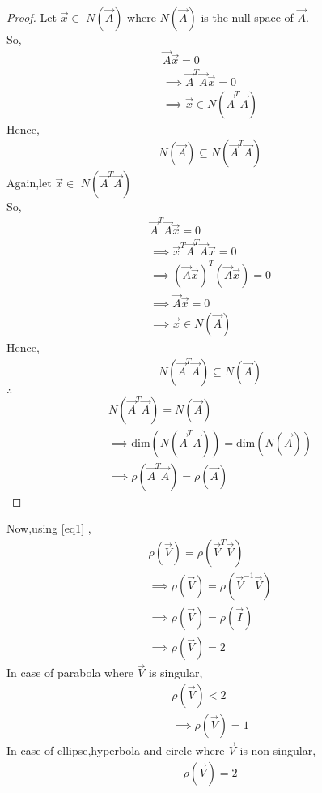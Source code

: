 \documentclass[journal,12pt,twocolumn]{IEEEtran}
\begin{document}
\begin{proof}
Let $\vec{x} \in$ $N(\vec{A})$ where $N(\vec{A})$ is the null space of $\vec{A}$.
\\
So,
\begin{align}
    \vec{A}\vec{x} = 0
    \\
    \implies \vec{A}^T\vec{A}\vec{x} = 0
    \\
    \implies \vec{x} \in N(\vec{A}^T\vec{A})
\end{align}
Hence,
\begin{align}
    N(\vec{A}) \subseteq N(\vec{A}^T\vec{A})
\end{align}
Again,let $\vec{x} \in$ $N(\vec{A}^T\vec{A})$
\\
So,
\begin{align}
    \vec{A}^T\vec{A}\vec{x} = 0
    \\
    \implies \vec{x}^T\vec{A}^T\vec{A}\vec{x} = 0
    \\
    \implies (\vec{A}\vec{x})^T(\vec{A}\vec{x}) = 0
    \\
    \implies \vec{A}\vec{x} = 0
    \\
    \implies \vec{x} \in N(\vec{A})
\end{align}
Hence,
\begin{align}
    N(\vec{A}^T\vec{A}) \subseteq N(\vec{A})
\end{align}
$\therefore$
\begin{align}
    N(\vec{A}^T\vec{A}) = N(\vec{A})
    \\
    \implies \text{dim}(N(\vec{A}^T\vec{A})) = \text{dim}(N(\vec{A}))
    \\
    \implies \rho(\vec{A}^T\vec{A}) = \rho(\vec{A})
\end{align}
\end{proof}

Now,using \eqref{eq1} ,
\begin{align}
    \rho(\vec{V}) = \rho(\vec{V}^T\vec{V})
    \\
    \implies \rho(\vec{V}) = \rho(\vec{V}^{-1}\vec{V}) 
    \\
    \implies \rho(\vec{V}) = \rho(\vec{I})
    \\
    \implies \rho(\vec{V}) = 2
\end{align}
In case of parabola where $\vec{V}$ is singular,
\begin{align}
    \rho(\vec{V}) < 2
    \\
    \implies \rho(\vec{V}) =1
\end{align}
In case of ellipse,hyperbola and circle where $\vec{V}$ is non-singular,
\begin{align}
    \rho(\vec{V}) = 2
\end{align}
\end{document}
